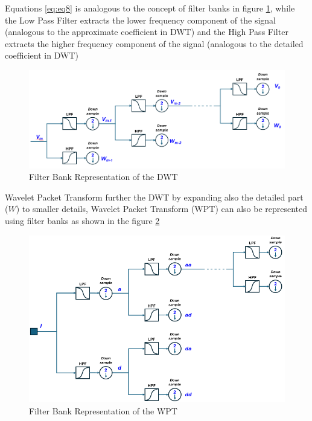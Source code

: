 \documentclass{svproc}
\begin{document}
\noindent
Equations \ref{eq:eq8} is analogous to the concept of filter banks in figure \ref{fig:DWT_Filterbank}, while the Low Pass Filter extracts the lower frequency component of the signal (analogous to the approximate coefficient in DWT) and the High Pass Filter extracts the higher frequency component of the signal (analogous to the detailed coefficient in DWT)
\begin{figure}[H] 
  \centering
    \includegraphics[width=0.5\linewidth]{figures/WT_Filterbank.png}
    \caption{Filter Bank Representation of the DWT}
    \label{fig:DWT_Filterbank}
\end{figure}
\noindent
Wavelet Packet Transform further the DWT by expanding also the detailed part ($W$) to smaller details, Wavelet Packet Transform (WPT) can also be represented using filter banks as shown in the figure \ref{fig:WPT_Filterbank}
\begin{figure}[H] 
  \centering
    \includegraphics[width=0.5\linewidth]{figures/WT_Filterpacket.png}
    \caption{Filter Bank Representation of the WPT}
    \label{fig:WPT_Filterbank}
\end{figure}
\end{document}
